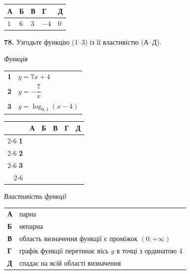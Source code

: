 \documentclass[14pt]{extarticle}
\newcommand{\answerGrid}{
    \begingroup
    \renewcommand{\arraystretch}{1.3} 
    \setlength{\tabcolsep}{7pt} 
    \begin{tabular}{r|c|c|c|c|c|}
         \multicolumn{1}{c}{} & \multicolumn{1}{c}{\textbf{А}} & \multicolumn{1}{c}{\textbf{Б}} & \multicolumn{1}{c}{\textbf{В}} & \multicolumn{1}{c}{\textbf{Г}} & \multicolumn{1}{c}{\textbf{Д}} \\ \cline{2-6}
         \textbf{1} & & & & & \\ \cline{2-6}
         \textbf{2} & & & & & \\ \cline{2-6}
         \textbf{3} & & & & & \\ \cline{2-6}
    \end{tabular}
    \endgroup
}
\newcommand{\answerTable}[5]{
\begin{center}
\begin{tabular}{|*{5}{>{\centering\arraybackslash}m{2.8cm}|}}
\hline
\rule[-0.3cm]{0pt}{0.8cm}\textbf{А} & \textbf{Б} & \textbf{В} & \textbf{Г} & \textbf{Д} \\
\hline
\rule[-0.4cm]{0pt}{1.0cm}#1 & \rule[-0.4cm]{0pt}{1.0cm}#2 & \rule[-0.4cm]{0pt}{1.0cm}#3 & \rule[-0.4cm]{0pt}{1.0cm}#4 & \rule[-0.4cm]{0pt}{1.0cm}#5 \\
\hline
\end{tabular}
\end{center}
}
\begin{document}
\vspace{0.3cm}
\answerTable{$1$}{$6$}{$3$}{$-4$}{$0$}

\vspace{0.7cm}

\noindent\textbf{78.} Узгодьте функцію (1--3) із її властивістю (А--Д).

\vspace{0.3cm}

\noindent
\begin{minipage}[t]{0.45\textwidth}
    \textit{Функція} \par \vspace{0.2cm}
    \begin{tabular}{@{}p{0.5cm} l@{}}
    \textbf{1} & $y=7x+4$ \\[0.4cm]
    \textbf{2} & $y=-\dfrac{7}{x}$ \\[0.4cm]
    \textbf{3} & $y=\log_{0{,}1}(x-4)$ \\
    \end{tabular}

    \vspace{1.0cm}
    \answerGrid
\end{minipage}%
\hfill
\begin{minipage}[t]{0.50\textwidth}
    \textit{Властивість функції} \par \vspace{0.2cm}
    \begin{tabular}{@{}p{0.5cm} p{7cm}@{}}
    \textbf{А} & парна \\[0.2cm]
    \textbf{Б} & непарна \\[0.2cm]
    \textbf{В} & область визначення функції є проміжок $(0; +\infty)$ \\[0.2cm]
    \textbf{Г} & графік функції перетинає вісь $y$ в точці з ординатою 4 \\[0.2cm]
    \textbf{Д} & спадає на всій області визначення \\
    \end{tabular}
\end{minipage}

\vspace{0.7cm}
\end{document}
